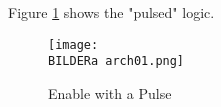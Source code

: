 
Figure \ref{fig:asArch01} shows the "pulsed" logic.
\begin{figure}[H] 
\centering
  \texttt{[image: \\BILDERa arch01.png]}
\caption{Enable with a Pulse}
\label{fig:asArch01}
\end{figure}
